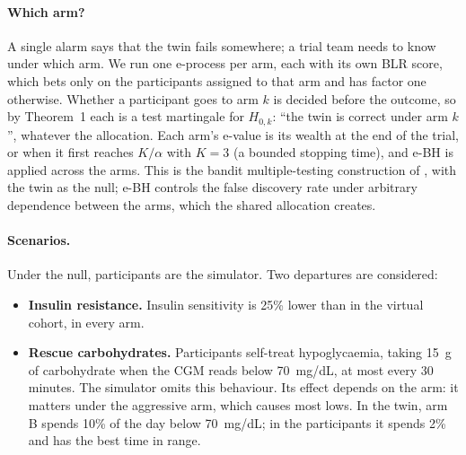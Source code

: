 \documentclass[11pt]{article}
\theoremstyle{remark}
\begin{document}
\paragraph{Which arm?} A single alarm says that the twin fails somewhere; a
trial team needs to know under which arm. We run one e-process per arm, each
with its own BLR score, which bets only on the participants assigned to that
arm and has factor one otherwise. Whether a participant goes to arm $k$ is
decided before the outcome, so by Theorem~1 each is a test
martingale for $H_{0,k}$: ``the twin is correct under arm $k$'', whatever the
allocation. Each arm's e-value is its wealth at the end of the trial, or when
it first reaches $K/\alpha$ with $K = 3$ (a bounded stopping time), and e-BH
\citep{wang2022false} is applied across the arms. This is the bandit
multiple-testing construction of \citet{xu2021unified}, with the twin as the
null; e-BH controls the false discovery rate under arbitrary dependence
between the arms, which the shared allocation creates.

\paragraph{Scenarios.} Under the null, participants are the simulator. Two
departures are considered:
\begin{itemize}
  \item \textbf{Insulin resistance.} Insulin sensitivity is 25\% lower than in
        the virtual cohort, in every arm.
  \item \textbf{Rescue carbohydrates.} Participants self-treat hypoglycaemia,
        taking 15~g of carbohydrate when the CGM reads below 70~mg/dL, at most
        every 30 minutes. The simulator omits this behaviour. Its effect
        depends on the arm: it matters under the aggressive arm, which causes
        most lows. In the twin, arm B spends 10\% of the day below 70~mg/dL; in
        the participants it spends 2\% and has the best time in range.
\end{itemize}
\end{document}

